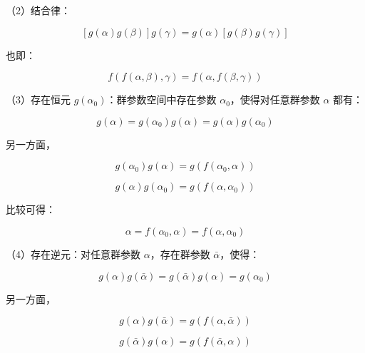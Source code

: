 （2）结合律：

\begin{equation}
\left[g\left(\alpha\right) g\left(\beta\right) \right] g\left(\gamma\right)
=g\left(\alpha\right)\left[g\left(\beta\right)g\left(\gamma\right) \right]
\end{equation}

也即：

\begin{equation}
f\left(f\left(\alpha,\beta\right),\gamma\right)
=f\left(\alpha,f\left(\beta,\gamma\right)\right)
\end{equation}

（3）存在恒元 $g\left(\alpha_0\right)$：群参数空间中存在参数 $\alpha_0$，使得对任意群参数 $\alpha$ 都有：

\begin{equation}
g\left(\alpha\right)
=g\left(\alpha_0\right)g\left(\alpha\right)=g\left(\alpha\right)g\left(\alpha_0\right)
\end{equation}

另一方面，

\begin{equation}
g\left(\alpha_0\right)g\left(\alpha\right)=g\left(f\left(\alpha_0,\alpha\right)\right)
\end{equation}

\begin{equation}
g\left(\alpha\right)g\left(\alpha_0\right)=g\left(f\left(\alpha,\alpha_0\right)\right)
\end{equation}

比较可得：

\begin{equation}
\alpha
=f\left(\alpha_0,\alpha\right)=f\left(\alpha,\alpha_0\right)
\end{equation}

（4）存在逆元：对任意群参数 $\alpha$，存在群参数 $\bar{\alpha}$，使得：

\begin{equation}
g\left(\alpha\right)g\left(\bar{\alpha}\right)
=g\left(\bar{\alpha}\right)g\left(\alpha\right)
=g\left(\alpha_0\right)
\end{equation}

另一方面，

\begin{equation}
g\left(\alpha\right)g\left(\bar{\alpha}\right)=g\left(f\left(\alpha,\bar{\alpha}\right)\right)
\end{equation}

\begin{equation}
g\left(\bar{\alpha}\right)g\left(\alpha\right)=g\left(f\left(\bar{\alpha},\alpha\right)\right)
\end{equation}

